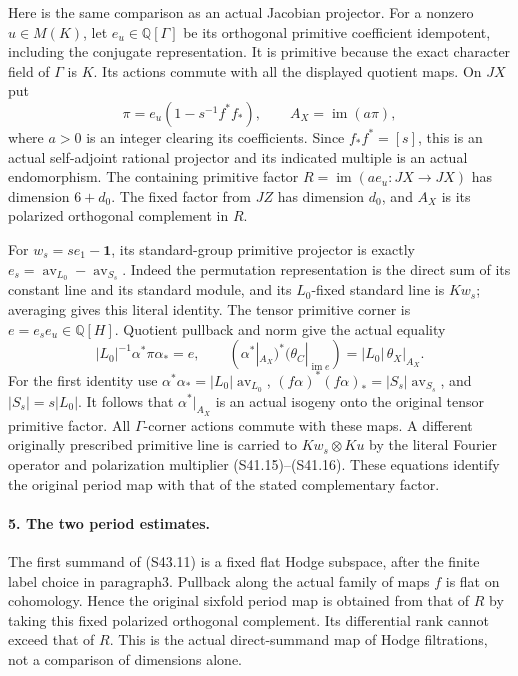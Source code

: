 Here is the same comparison as an actual Jacobian projector.
For a nonzero \(u\in M(K)\), let \(e_u\in\mathbb Q[\Gamma]\)
be its orthogonal primitive coefficient idempotent, including
the conjugate representation. It is primitive because the
exact character field of \(\Gamma\) is \(K\).
Its actions commute with all the displayed quotient maps.
On \(JX\) put
\[
              \pi=e_u(1-s^{-1}f^*f_*),\qquad
                    A_X=\operatorname{im}(a\pi),          \tag{S43.12}
\]
where \(a>0\) is an integer clearing its coefficients.
Since \(f_*f^*=[s]\), this is an actual self-adjoint
rational projector and its indicated multiple is an
actual endomorphism. The containing primitive factor
\(R=\operatorname{im}(a e_u:JX\to JX)\) has dimension
\(6+d_0\). The fixed factor from \(JZ\) has dimension
\(d_0\), and \(A_X\) is its polarized orthogonal
complement in \(R\).

For \(w_s=se_1-\boldsymbol1\), its standard-group
primitive projector is exactly
\(e_s=\operatorname{av}_{L_0}-\operatorname{av}_{S_s}\).
Indeed the permutation representation is the direct sum of
its constant line and its standard module, and its
\(L_0\)-fixed standard line is \(Kw_s\); averaging
gives this literal identity. The tensor primitive corner is
\(e=e_s e_u\in\mathbb Q[H]\). Quotient pullback and
norm give the actual equality
\[
       |L_0|^{-1}\alpha^*\pi\alpha_*=e,
       \qquad
       (\alpha^*|_{A_X})^*(\theta_C|_{\operatorname{im}e})
                            =|L_0|\,\theta_X|_{A_X}.       \tag{S43.13}
\]
For the first identity use
\(\alpha^*\alpha_*=|L_0|\operatorname{av}_{L_0}\),
\((f\alpha)^*(f\alpha)_*=|S_s|\operatorname{av}_{S_s}\),
and \(|S_s|=s|L_0|\). It follows that
\(\alpha^*|_{A_X}\) is an actual isogeny onto the original
tensor primitive factor. All \(\Gamma\)-corner actions
commute with these maps. A different originally prescribed
primitive line is carried to \(Kw_s\otimes Ku\) by
the literal Fourier operator and polarization multiplier
(S41.15)--(S41.16). These equations identify the original
period map with that of the stated complementary factor.

\paragraph{5. The two period estimates.}
The first summand of (S43.11) is a fixed flat Hodge
subspace, after the finite label choice in paragraph3.
Pullback along the actual family of maps \(f\) is flat
on cohomology. Hence the original sixfold period map is
obtained from that of \(R\) by taking this fixed polarized
orthogonal complement. Its differential rank cannot exceed
that of \(R\). This is the actual direct-summand map of
Hodge filtrations, not a comparison of dimensions alone.

